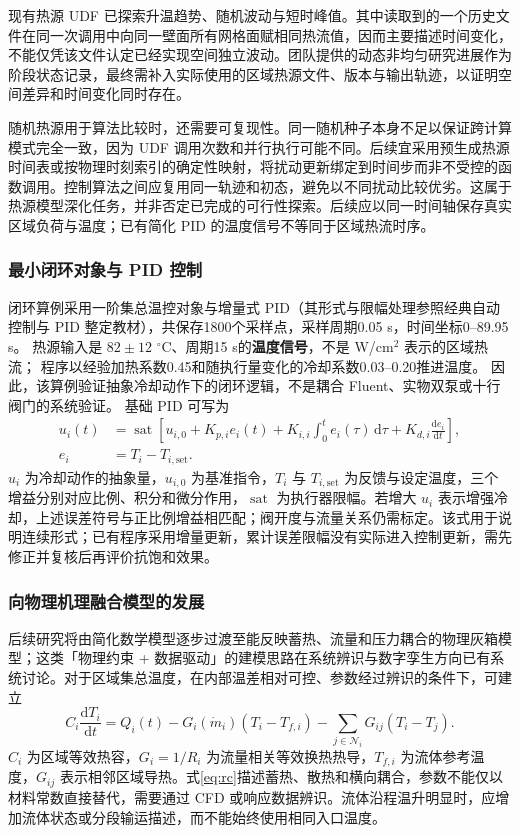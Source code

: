 \documentclass[UTF8]{midterm}
\begin{document}
现有热源 UDF 已探索升温趋势、随机波动与短时峰值。其中读取到的一个历史文件在同一次调用中向同一壁面所有网格面赋相同热流值，因而主要描述时间变化，不能仅凭该文件认定已经实现空间独立波动。团队提供的动态非均匀研究进展作为阶段状态记录，最终需补入实际使用的区域热源文件、版本与输出轨迹，以证明空间差异和时间变化同时存在。

随机热源用于算法比较时，还需要可复现性。同一随机种子本身不足以保证跨计算模式完全一致，因为 UDF 调用次数和并行执行可能不同。后续宜采用预生成热源时间表或按物理时刻索引的确定性映射，将扰动更新绑定到时间步而非不受控的函数调用。控制算法之间应复用同一轨迹和初态，避免以不同扰动比较优劣。这属于热源模型深化任务，并非否定已完成的可行性探索。后续应以同一时间轴保存真实区域负荷与温度；已有简化 PID 的温度信号不等同于区域热流时序。


\subsubsection{最小闭环对象与 PID 控制}

闭环算例采用一阶集总温控对象与增量式 PID（其形式与限幅处理参照经典自动控制与 PID 整定教材\cite{hushousong,astrom,ogata}），共保存1800个采样点，采样周期0.05 s，时间坐标0--89.95 s。
热源输入是 $82\pm12$ $^\circ$C、周期15 s的\textbf{温度信号}，不是 W/cm$^2$ 表示的区域热流；
程序以经验加热系数0.45和随执行量变化的冷却系数0.03--0.20推进温度。
因此，该算例验证抽象冷却动作下的闭环逻辑，不是耦合 Fluent、实物双泵或十行阀门的系统验证。
基础 PID 可写为
\begin{equation}\begin{aligned}
u_i(t)&=\operatorname{sat}\left[u_{i,0}+K_{p,i}e_i(t)+K_{i,i}\int_0^t e_i(\tau)\,\mathrm d\tau+K_{d,i}\frac{\mathrm de_i}{\mathrm dt}\right],\\
e_i&=T_i-T_{i,\mathrm{set}}.
\end{aligned}\label{eq:pid}
\end{equation}
$u_i$ 为冷却动作的抽象量，$u_{i,0}$ 为基准指令，$T_i$ 与 $T_{i,\mathrm{set}}$ 为反馈与设定温度，三个增益分别对应比例、积分和微分作用，$\operatorname{sat}$ 为执行器限幅。若增大 $u_i$ 表示增强冷却，上述误差符号与正比例增益相匹配；阀开度与流量关系仍需标定。该式用于说明连续形式；已有程序采用增量更新，累计误差限幅没有实际进入控制更新，需先修正并复核后再评价抗饱和效果。

\subsubsection{向物理机理融合模型的发展}
后续研究将由简化数学模型逐步过渡至能反映蓄热、流量和压力耦合的物理灰箱模型；这类「物理约束 + 数据驱动」的建模思路在系统辨识与数字孪生方向已有系统讨论\cite{brunton,tao}。对于区域集总温度，在内部温差相对可控、参数经过辨识的条件下，可建立
\begin{equation}
C_i\frac{\mathrm dT_i}{\mathrm dt}=Q_i(t)-G_i(\dot m_i)(T_i-T_{f,i})
-\sum_{j\in\mathcal N_i}G_{ij}(T_i-T_j).\label{eq:rc}
\end{equation}
$C_i$ 为区域等效热容，$G_i=1/R_i$ 为流量相关等效换热热导，$T_{f,i}$ 为流体参考温度，$G_{ij}$ 表示相邻区域导热。式\eqref{eq:rc}描述蓄热、散热和横向耦合，参数不能仅以材料常数直接替代，需要通过 CFD 或响应数据辨识。流体沿程温升明显时，应增加流体状态或分段输运描述，而不能始终使用相同入口温度。
\end{document}
